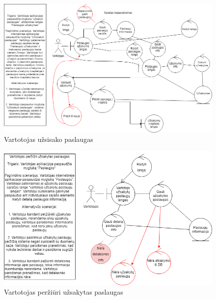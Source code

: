\documentclass[oneside]{VUMIFPSkursinis}
\begin{document}
			\begin{figure}[h]
    				\centering
    				\includegraphics[width=1\textwidth]{rob6.png}
    				\caption{Vartotojas užsisako paslaugas}
    				\label{fig:Vartotojas užsisako paslaugas}
			\end{figure}

			\begin{figure}[h]
    				\centering
    				\includegraphics[width=1\textwidth]{rob7.png}
    				\caption{Vartotojas peržiūri užsakytas paslaugas}
    				\label{fig:Vartotojas peržiūri užsakytas paslaugas}
			\end{figure}
\end{document}
